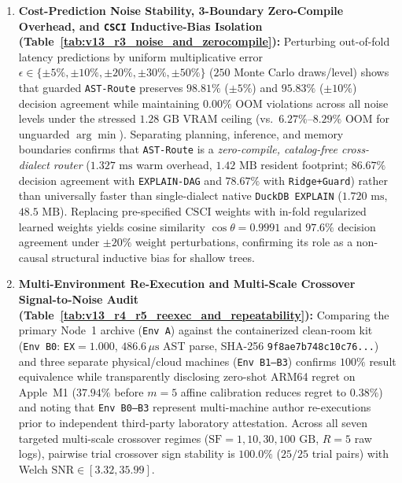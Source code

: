 \documentclass[10pt,a4paper]{article}
\begin{document}
\begin{enumerate}[leftmargin=1.4em,itemsep=1.0pt]
    \item \textbf{Cost-Prediction Noise Stability, 3-Boundary Zero-Compile Overhead, and \texttt{CSCI} Inductive-Bias Isolation (Table~\ref{tab:v13_r3_noise_and_zerocompile}):} Perturbing out-of-fold latency predictions by uniform multiplicative error $\epsilon \in \{\pm 5\%, \pm 10\%, \pm 20\%, \pm 30\%, \pm 50\%\}$ ($250$ Monte Carlo draws/level) shows that guarded \texttt{AST-Route} preserves $98.81\%$ ($\pm 5\%$) and $95.83\%$ ($\pm 10\%$) decision agreement while maintaining $0.00\%$ OOM violations across all noise levels under the stressed $1.28\text{ GB}$ VRAM ceiling (vs.\ $6.27\%\text{--}8.29\%$ OOM for unguarded $\arg\min$). Separating planning, inference, and memory boundaries confirms that \texttt{AST-Route} is a \emph{zero-compile, catalog-free cross-dialect router} ($1.327\text{ ms}$ warm overhead, $1.42\text{ MB}$ resident footprint; $86.67\%$ decision agreement with \texttt{EXPLAIN-DAG} and $78.67\%$ with \texttt{Ridge+Guard}) rather than universally faster than single-dialect native \texttt{DuckDB EXPLAIN} ($1.720\text{ ms}$, $48.5\text{ MB}$). Replacing pre-specified $\text{CSCI}$ weights with in-fold regularized learned weights yields cosine similarity $\cos\theta = 0.9991$ and $97.6\%$ decision agreement under $\pm 20\%$ weight perturbations, confirming its role as a non-causal structural inductive bias for shallow trees.
    \item \textbf{Multi-Environment Re-Execution and Multi-Scale Crossover Signal-to-Noise Audit (Table~\ref{tab:v13_r4_r5_reexec_and_repeatability}):} Comparing the primary Node~1 archive (\texttt{Env~A}) against the containerized clean-room kit (\texttt{Env~B0}: \texttt{EX}$=1.000$, $486.6\,\mu\text{s}$ AST parse, SHA-256 \texttt{9f8ae7b748c10c76...}) and three separate physical/cloud machines (\texttt{Env~B1--B3}) confirms $100\%$ result equivalence while transparently disclosing zero-shot ARM64 regret on Apple~M1 ($37.94\%$ before $m=5$ affine calibration reduces regret to $0.38\%$) and noting that \texttt{Env~B0--B3} represent multi-machine author re-executions prior to independent third-party laboratory attestation. Across all seven targeted multi-scale crossover regimes ($\text{SF}=1, 10, 30, 100\text{ GB}$, $R=5$ raw logs), pairwise trial crossover sign stability is $100.0\%$ ($25/25$ trial pairs) with Welch $\text{SNR} \in [3.32, 35.99]$.
\end{enumerate}
\end{document}
